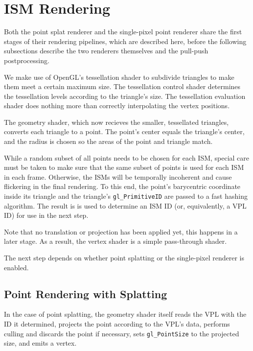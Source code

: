 \section{ISM Rendering}
\label{sec:impl:ismRendering}

Both the point splat renderer and the single-pixel point renderer share the first stages of their rendering pipelines, which are described here, before the following subsections describe the two renderers themselves and the pull-push postprocessing.

We make use of OpenGL's tessellation shader to subdivide triangles to make them meet a certain maximum size. The tessellation control shader determines the tessellation levels according to the triangle's size. The tessellation evaluation shader does nothing more than correctly interpolating the vertex positions.

The geometry shader, which now recieves the smaller, tessellated triangles, converts each triangle to a point. The point's center equals the triangle's center, and the radius is chosen so the areas of the point and triangle match.


While a random subset of all points needs to be chosen for each ISM, special care must be taken to make sure that the same subset of points is used for each ISM in each frame. Otherwise, the ISMs will be temporally incoherent and cause flickering in the final rendering. To this end, the point's barycentric coordinate inside its triangle and the triangle's \texttt{gl\_PrimitiveID} are passed to a fast hashing algorithm. The result is is used to determine an ISM ID (or, equivalently, a VPL ID) for use in the next step.

Note that no translation or projection has been applied yet, this happens in a later stage. As a result, the vertex shader is a simple pass-through shader.

The next step depends on whether point splatting or the single-pixel renderer is enabled.



\subsection{Point Rendering with Splatting}
\label{sec:impl:splatting}

In the case of point splatting, the geometry shader itself reads the VPL with the ID it determined, projects the point according to the VPL's data, performs culling and discards the point if necessary, sets \texttt{gl\_PointSize} to the projected size, and emits a vertex.

